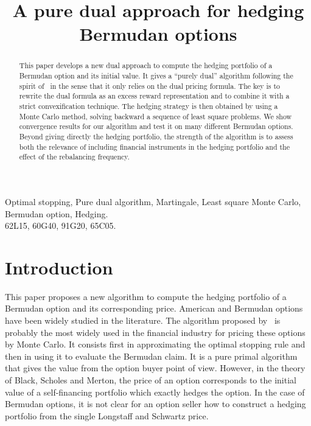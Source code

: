 
\title{
A pure dual approach for hedging Bermudan options}
\maketitle
\begin{abstract}
  This paper develops a new dual approach
  to compute the hedging portfolio of a Bermudan option and its initial value. It gives a ``purely dual'' algorithm following the spirit of~\cite{rogers-10} in the sense that it only relies on the dual pricing formula. The key is to rewrite the dual formula as an excess reward representation and to combine it with a strict convexification technique. The hedging strategy is then obtained by using a Monte Carlo method, solving backward a sequence of least square problems. We show convergence results for our algorithm and test it on many different Bermudan options. Beyond giving directly the hedging portfolio, the strength of the algorithm is to assess both the relevance of including financial instruments in the hedging portfolio and the effect of the rebalancing frequency.
\end{abstract}
 Optimal stopping, Pure dual algorithm, Martingale, Least square Monte Carlo, Bermudan option, Hedging.\\
 62L15, 60G40, 91G20, 65C05.





\section*{Introduction}

This paper proposes a new algorithm to compute the hedging portfolio of a Bermudan option and its corresponding price. American and Bermudan options have been widely studied in the literature. The algorithm proposed by~\cite{LS} is probably the most widely used in the financial industry for pricing these options by Monte Carlo. It consists first in approximating the optimal stopping rule and then in using it to evaluate the Bermudan claim. It is a pure primal algorithm that gives the value from the option buyer point of view. However, in the theory of Black, Scholes and Merton, the price of an option corresponds to the initial value of a self-financing portfolio which exactly hedges the option. In the case of Bermudan options, it is not clear for an option seller how to construct a hedging portfolio from the single Longstaff and Schwartz price.

